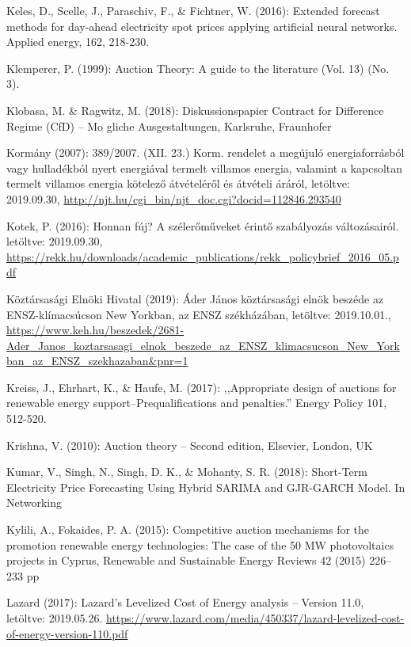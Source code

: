 \documentclass[twoside, magyar, showtrims]{corvinusphd}
\begin{document}
\begin{thebibliography}{99}
Keles, D., Scelle, J., Paraschiv, F., \& Fichtner, W. (2016): Extended forecast methods for day-ahead electricity spot prices applying artificial neural networks. Applied energy, 162, 218-230.

Klemperer, P. (1999): Auction Theory: A guide to the literature (Vol. 13) (No. 3).

Klobasa, M. \& Ragwitz, M. (2018): Diskussionspapier Contract for Difference Regime (CfD) – Mo gliche Ausgestaltungen, Karlsruhe, Fraunhofer

Kormány (2007): 389/2007. (XII. 23.) Korm. rendelet a megújuló energiaforrásból vagy hulladékból nyert energiával termelt villamos energia, valamint a kapcsoltan termelt villamos energia kötelező átvételéről és átvételi áráról, letöltve: 2019.09.30,
\url{http://njt.hu/cgi\_bin/njt\_doc.cgi?docid=112846.293540}

Kotek, P. (2016): Honnan fúj? A szélerőműveket érintő szabályozás változásairól. letöltve: 2019.09.30,
\url{https://rekk.hu/downloads/academic\_publications/rekk\_policybrief\_2016\_05.pdf}

Köztársasági Elnöki Hivatal (2019): Áder János köztársasági elnök beszéde az ENSZ-klímacsúcson New Yorkban, az ENSZ székházában, letöltve: 2019.10.01.,
\url{https://www.keh.hu/beszedek/2681-Ader\_Janos\_koztarsasagi\_elnok\_beszede\_az\_ENSZ\_klimacsucson\_New\_Yorkban\_az\_ENSZ\_szekhazaban\&pnr=1}

Kreiss, J., Ehrhart, K., \& Haufe, M. (2017): ,,Appropriate design of auctions for renewable energy support–Prequalifications and penalties.'' Energy Policy 101, 512-520.

Krishna, V. (2010): Auction theory – Second edition, Elsevier, London, UK

Kumar, V., Singh, N., Singh, D. K., \& Mohanty, S. R. (2018): Short-Term Electricity Price Forecasting Using Hybrid SARIMA and GJR-GARCH Model. In Networking 

Kylili, A., Fokaides, P. A. (2015): Competitive auction mechanisms for the promotion renewable energy technologies: The case of the 50 MW photovoltaics projects in Cyprus, Renewable and Sustainable Energy Reviews 42 (2015) 226–233 pp

Lazard (2017): Lazard’s Levelized Cost of Energy analysis – Version 11.0, letöltve: 2019.05.26.
\url{https://www.lazard.com/media/450337/lazard-levelized-cost-of-energy-version-110.pdf}


\end{thebibliography}
\end{document}
